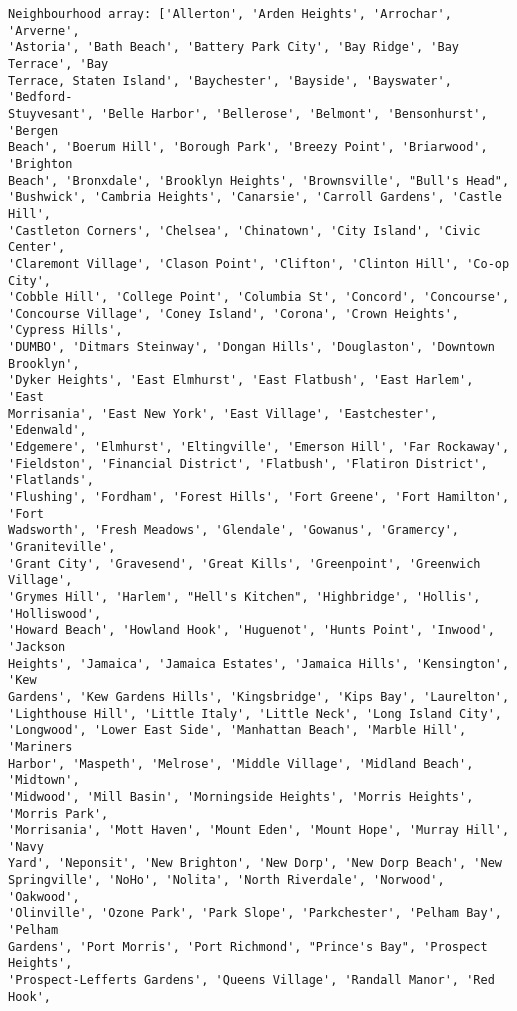 \documentclass[11pt]{article}
\begin{document}
    \begin{Verbatim}[commandchars=\\\{\}]
Neighbourhood array: ['Allerton', 'Arden Heights', 'Arrochar', 'Arverne',
'Astoria', 'Bath Beach', 'Battery Park City', 'Bay Ridge', 'Bay Terrace', 'Bay
Terrace, Staten Island', 'Baychester', 'Bayside', 'Bayswater', 'Bedford-
Stuyvesant', 'Belle Harbor', 'Bellerose', 'Belmont', 'Bensonhurst', 'Bergen
Beach', 'Boerum Hill', 'Borough Park', 'Breezy Point', 'Briarwood', 'Brighton
Beach', 'Bronxdale', 'Brooklyn Heights', 'Brownsville', "Bull's Head",
'Bushwick', 'Cambria Heights', 'Canarsie', 'Carroll Gardens', 'Castle Hill',
'Castleton Corners', 'Chelsea', 'Chinatown', 'City Island', 'Civic Center',
'Claremont Village', 'Clason Point', 'Clifton', 'Clinton Hill', 'Co-op City',
'Cobble Hill', 'College Point', 'Columbia St', 'Concord', 'Concourse',
'Concourse Village', 'Coney Island', 'Corona', 'Crown Heights', 'Cypress Hills',
'DUMBO', 'Ditmars Steinway', 'Dongan Hills', 'Douglaston', 'Downtown Brooklyn',
'Dyker Heights', 'East Elmhurst', 'East Flatbush', 'East Harlem', 'East
Morrisania', 'East New York', 'East Village', 'Eastchester', 'Edenwald',
'Edgemere', 'Elmhurst', 'Eltingville', 'Emerson Hill', 'Far Rockaway',
'Fieldston', 'Financial District', 'Flatbush', 'Flatiron District', 'Flatlands',
'Flushing', 'Fordham', 'Forest Hills', 'Fort Greene', 'Fort Hamilton', 'Fort
Wadsworth', 'Fresh Meadows', 'Glendale', 'Gowanus', 'Gramercy', 'Graniteville',
'Grant City', 'Gravesend', 'Great Kills', 'Greenpoint', 'Greenwich Village',
'Grymes Hill', 'Harlem', "Hell's Kitchen", 'Highbridge', 'Hollis', 'Holliswood',
'Howard Beach', 'Howland Hook', 'Huguenot', 'Hunts Point', 'Inwood', 'Jackson
Heights', 'Jamaica', 'Jamaica Estates', 'Jamaica Hills', 'Kensington', 'Kew
Gardens', 'Kew Gardens Hills', 'Kingsbridge', 'Kips Bay', 'Laurelton',
'Lighthouse Hill', 'Little Italy', 'Little Neck', 'Long Island City',
'Longwood', 'Lower East Side', 'Manhattan Beach', 'Marble Hill', 'Mariners
Harbor', 'Maspeth', 'Melrose', 'Middle Village', 'Midland Beach', 'Midtown',
'Midwood', 'Mill Basin', 'Morningside Heights', 'Morris Heights', 'Morris Park',
'Morrisania', 'Mott Haven', 'Mount Eden', 'Mount Hope', 'Murray Hill', 'Navy
Yard', 'Neponsit', 'New Brighton', 'New Dorp', 'New Dorp Beach', 'New
Springville', 'NoHo', 'Nolita', 'North Riverdale', 'Norwood', 'Oakwood',
'Olinville', 'Ozone Park', 'Park Slope', 'Parkchester', 'Pelham Bay', 'Pelham
Gardens', 'Port Morris', 'Port Richmond', "Prince's Bay", 'Prospect Heights',
'Prospect-Lefferts Gardens', 'Queens Village', 'Randall Manor', 'Red Hook',

\end{Verbatim}
\end{document}
